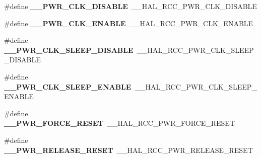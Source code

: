 \begin{DoxyCompactItemize}
\item 
\hypertarget{group___h_a_l___r_c_c___aliased_ga618cc267c53fbccdcfeea3d953346693}{\#define {\bfseries \-\_\-\-\_\-\-P\-W\-R\-\_\-\-C\-L\-K\-\_\-\-D\-I\-S\-A\-B\-L\-E}~\-\_\-\-\_\-\-H\-A\-L\-\_\-\-R\-C\-C\-\_\-\-P\-W\-R\-\_\-\-C\-L\-K\-\_\-\-D\-I\-S\-A\-B\-L\-E}\label{group___h_a_l___r_c_c___aliased_ga618cc267c53fbccdcfeea3d953346693}

\item 
\hypertarget{group___h_a_l___r_c_c___aliased_gaa17a85c19b592523e867e5ace160d548}{\#define {\bfseries \-\_\-\-\_\-\-P\-W\-R\-\_\-\-C\-L\-K\-\_\-\-E\-N\-A\-B\-L\-E}~\-\_\-\-\_\-\-H\-A\-L\-\_\-\-R\-C\-C\-\_\-\-P\-W\-R\-\_\-\-C\-L\-K\-\_\-\-E\-N\-A\-B\-L\-E}\label{group___h_a_l___r_c_c___aliased_gaa17a85c19b592523e867e5ace160d548}

\item 
\hypertarget{group___h_a_l___r_c_c___aliased_ga67d15dd9401936a16ba4fdd94a0c86e3}{\#define {\bfseries \-\_\-\-\_\-\-P\-W\-R\-\_\-\-C\-L\-K\-\_\-\-S\-L\-E\-E\-P\-\_\-\-D\-I\-S\-A\-B\-L\-E}~\-\_\-\-\_\-\-H\-A\-L\-\_\-\-R\-C\-C\-\_\-\-P\-W\-R\-\_\-\-C\-L\-K\-\_\-\-S\-L\-E\-E\-P\-\_\-\-D\-I\-S\-A\-B\-L\-E}\label{group___h_a_l___r_c_c___aliased_ga67d15dd9401936a16ba4fdd94a0c86e3}

\item 
\hypertarget{group___h_a_l___r_c_c___aliased_gae4c3fb6253fe1ea5fab7511ab41caae7}{\#define {\bfseries \-\_\-\-\_\-\-P\-W\-R\-\_\-\-C\-L\-K\-\_\-\-S\-L\-E\-E\-P\-\_\-\-E\-N\-A\-B\-L\-E}~\-\_\-\-\_\-\-H\-A\-L\-\_\-\-R\-C\-C\-\_\-\-P\-W\-R\-\_\-\-C\-L\-K\-\_\-\-S\-L\-E\-E\-P\-\_\-\-E\-N\-A\-B\-L\-E}\label{group___h_a_l___r_c_c___aliased_gae4c3fb6253fe1ea5fab7511ab41caae7}

\item 
\hypertarget{group___h_a_l___r_c_c___aliased_gaa878da3a908b357042a24fc177d6244d}{\#define {\bfseries \-\_\-\-\_\-\-P\-W\-R\-\_\-\-F\-O\-R\-C\-E\-\_\-\-R\-E\-S\-E\-T}~\-\_\-\-\_\-\-H\-A\-L\-\_\-\-R\-C\-C\-\_\-\-P\-W\-R\-\_\-\-F\-O\-R\-C\-E\-\_\-\-R\-E\-S\-E\-T}\label{group___h_a_l___r_c_c___aliased_gaa878da3a908b357042a24fc177d6244d}

\item 
\hypertarget{group___h_a_l___r_c_c___aliased_ga0898b8766cef7eba2878aee8bd444b52}{\#define {\bfseries \-\_\-\-\_\-\-P\-W\-R\-\_\-\-R\-E\-L\-E\-A\-S\-E\-\_\-\-R\-E\-S\-E\-T}~\-\_\-\-\_\-\-H\-A\-L\-\_\-\-R\-C\-C\-\_\-\-P\-W\-R\-\_\-\-R\-E\-L\-E\-A\-S\-E\-\_\-\-R\-E\-S\-E\-T}\label{group___h_a_l___r_c_c___aliased_ga0898b8766cef7eba2878aee8bd444b52}


\end{DoxyCompactItemize}
